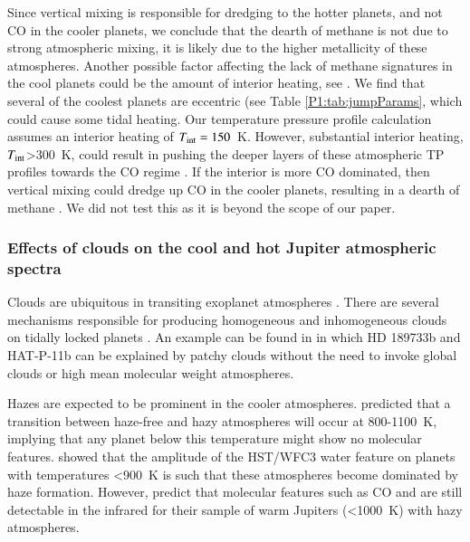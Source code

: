 Since vertical mixing is responsible for dredging  to the hotter planets, and not CO in the cooler planets, we conclude that the dearth of methane is not due to strong atmospheric mixing, it is likely due to the higher metallicity of these atmospheres. Another possible factor affecting the lack of methane signatures in the cool planets could be the amount of interior heating, see \citet[e.g.,][]{Fortney2020}. We find that several of the coolest planets are eccentric (see Table \ref{P1:tab:jumpParams}, which could cause some tidal heating. Our temperature pressure profile calculation assumes an interior heating of $T_{\rm int}= 150$~K. However, substantial interior heating, $T_{\rm int}$>300~K, could result in pushing the deeper layers of these atmospheric TP profiles towards the CO regime \citep{Morley2017, Benneke2019, Thorngren2019, Thorngren2020}. If the interior is more CO dominated, then vertical mixing could dredge up CO in the cooler planets, resulting in a dearth of methane \citep[e.g.,][]{Moses2013}. We did not test this as it is beyond the scope of our paper.

\subsubsection{Effects of clouds on the cool and hot Jupiter atmospheric spectra}

Clouds are ubiquitous in transiting exoplanet atmospheres \citep{Sing2016}.
There are several mechanisms responsible for producing homogeneous and inhomogeneous clouds on tidally locked planets \citep{Parmentier2013, Parmentier2021, Helling2016, Helling2019a, Helling2019b}.
An example can be found in \citet{Line2016} in which HD 189733b and HAT-P-11b can be explained by patchy clouds without the need to invoke global clouds or high mean molecular weight atmospheres.

Hazes are expected to be prominent in the cooler atmospheres. \citet{Morley2015} predicted that a transition between haze-free and hazy atmospheres will occur at 800-1100~K, implying that any planet below this temperature might show no molecular features. \citet{Gao2020} showed that the amplitude of the HST/WFC3 water feature on planets with temperatures <900~K is such that these atmospheres become dominated by haze formation. However, \citep{Kawashima2019} predict that molecular features such as CO and  are still detectable in the infrared for their sample of warm Jupiters (<1000~K) with hazy atmospheres.

